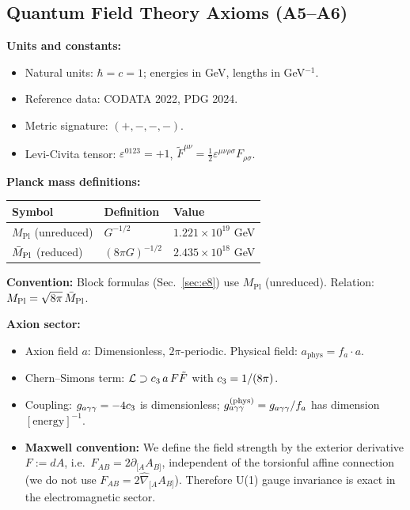 \subsection{Quantum Field Theory Axioms (A5--A6)}

\begin{tcolorbox}[colback=yellow!5, colframe=yellow!60!black, 
    title={\textbf{Conventions: Units, Masses, and Normalizations}}, fonttitle=\bfseries]

\textbf{Units and constants:}
\begin{itemize}[leftmargin=1.5em, topsep=2pt, itemsep=1pt]
    \item Natural units: $\hbar = c = 1$; energies in GeV, lengths in GeV$^{-1}$.
    \item Reference data: CODATA 2022, PDG 2024.
    \item Metric signature: $(+,-,-,-)$.
    \item Levi-Civita tensor: $\varepsilon^{0123} = +1$, $\tilde{F}^{\mu\nu} = \frac{1}{2}\varepsilon^{\mu\nu\rho\sigma}F_{\rho\sigma}$.
\end{itemize}

\textbf{Planck mass definitions:}
\begin{center}
\begin{tabular}{@{}lll@{}}
\toprule
\textbf{Symbol} & \textbf{Definition} & \textbf{Value}\\
\midrule
$M_{\mathrm{Pl}}$ (unreduced) & $G^{-1/2}$ & $1.221 \times 10^{19}$ GeV\\
$\bar{M}_{\mathrm{Pl}}$ (reduced) & $(8\pi G)^{-1/2}$ & $2.435 \times 10^{18}$ GeV\\
\bottomrule
\end{tabular}
\end{center}
\textbf{Convention:} Block formulas (Sec.~\ref{sec:e8}) use $M_{\mathrm{Pl}}$ (unreduced). 
Relation: $M_{\mathrm{Pl}} = \sqrt{8\pi}\,\bar{M}_{\mathrm{Pl}}$.

\textbf{Axion sector:}
\begin{itemize}[leftmargin=1.5em, topsep=2pt, itemsep=1pt]
    \item Axion field $a$: Dimensionless, $2\pi$-periodic. Physical field: $a_{\text{phys}} = f_a \cdot a$.
    \item Chern--Simons term: $\mathcal{L} \supset c_3\, a\, F\tilde{F}$ with $c_3 = 1/(8\pi)$.
    \item Coupling: $g_{a\gamma\gamma} = -4c_3$ is dimensionless; $g_{a\gamma\gamma}^{\text{(phys)}} = g_{a\gamma\gamma} / f_a$ has dimension $[\text{energy}]^{-1}$.
    \item \textbf{Maxwell convention:} We define the field strength by the exterior derivative $F := dA$, i.e.\ $F_{AB}=2\partial_{[A}A_{B]}$, independent of the torsionful affine connection (we do not use $F_{AB}=2\hat{\nabla}_{[A}A_{B]}$). Therefore U(1) gauge invariance is exact in the electromagnetic sector.
\end{itemize}
\end{tcolorbox}

